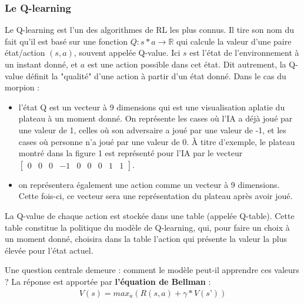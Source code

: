 \documentclass[french]{article}
\begin{document}
    \subsubsection{Le Q-learning}
    Le Q-learning est l'un des algorithmes de RL les plus connus. Il tire son nom du fait qu'il est basé sur une fonction $Q:s * a \rightarrow \mathbb{R}$ qui calcule la valeur d'une paire état/action $(s, a)$, souvent appelée Q-value. Ici $s$ est l'état de l'environnement à un instant donné, et $a$ est une action possible dans cet état. Dit autrement, la Q-value définit la "qualité" d'une action à partir d'un état donné. Dans le cas du morpion :
    \begin{itemize}
        \item l'état Q est un vecteur à 9 dimensions qui est une visualisation aplatie du plateau à un moment donné. On représente les cases où l'IA a déjà joué par une valeur de 1, celles où son adversaire a joué par une valeur de -1, et les cases où personne n'a joué par une valeur de 0. À titre d'exemple, le plateau montré dans la figure 1 est représenté pour l'IA par le vecteur $\begin{bmatrix}0&0&0&-1&0&0&0&1&1\end{bmatrix}$.
        \item on représentera également une action comme un vecteur à 9 dimensions. Cette fois-ci, ce vecteur sera une représentation du plateau après avoir joué.
    \end{itemize}

    La Q-value de chaque action est stockée dans une table (appelée Q-table). Cette table constitue la politique du modèle de Q-learning, qui, pour faire un choix à un moment donné, choisira dans la table l'action qui présente la valeur la plus élevée pour l'état actuel.

    Une question centrale demeure : comment le modèle peut-il apprendre ces valeurs ? La réponse est apportée par \textbf{l'équation de Bellman} :
    \begin{align*} 
        V(s)=max_a(R(s,a)+ \gamma*V(s’))
    \end{align*}
    
\end{document}
